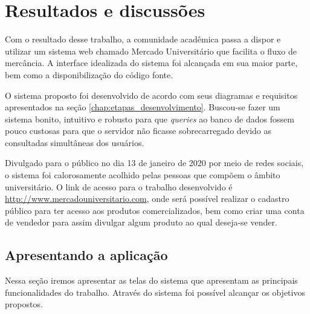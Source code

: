 \chapter{Resultados e discussões}
\label{chap:resultados}

Com o resultado desse trabalho, a comunidade acadêmica passa a dispor e utilizar um sistema web chamado Mercado Universitário que facilita o fluxo de mercância. A interface idealizada do sistema foi alcançada em sua maior parte, bem como a disponibilização do código fonte.

O sistema proposto foi desenvolvido de acordo com seus diagramas e requisitos apresentados na seção \ref{chap:etapas_desenvolvimento}. Buscou-se fazer um sistema bonito, intuitivo e robusto para que \textit{queries} ao banco de dados fossem pouco custosas para que o servidor não ficasse sobrecarregado devido as consultadas simultâneas dos usuários.

Divulgado para o público no dia 13 de janeiro de 2020 por meio de redes sociais, o sistema foi calorosamente acolhido pelas pessoas que compõem o âmbito universitário. O link de acesso para o trabalho desenvolvido é \url{http://www.mercadouniversitario.com}, onde será possível realizar o cadastro público para ter acesso aos produtos comercializados, bem como criar uma conta de vendedor para assim divulgar algum produto ao qual deseja-se vender.

\section{Apresentando a aplicação}

Nessa seção iremos apresentar as telas do sistema que apresentam as principais funcionalidades do trabalho.
Através do sistema foi possível alcançar os objetivos propostos.



